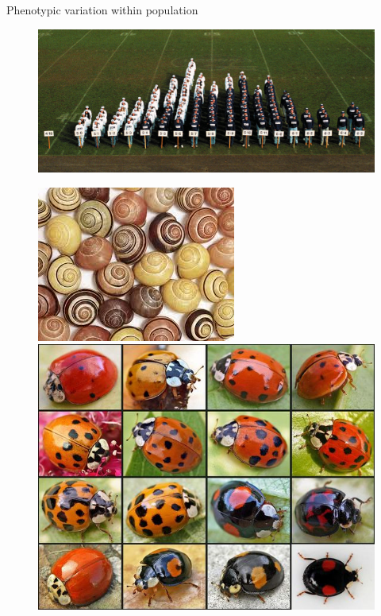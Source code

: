 \documentclass[10pt]{beamer}%
\begin{document}
\begin{frame}[plain]
\begin{columns}
\begin{column}[c]{0.7\textwidth}
\begin{figure}[c]
		\end{figure}
	\end{column}
	\end{columns}
\end{frame}

\begin{frame}{Phenotypic variation within population}
	\begin{figure}
		\includegraphics[width = 0.6 \textwidth]{Figures/Humansize}
	\end{figure}
	\begin{figure}
		\includegraphics[width = 0.45 \textwidth]{Figures/Cepaea}\hspace{0.1cm}		
		\includegraphics[width = 0.45 \textwidth]{Figures/Harmonia}
	\end{figure}
\end{frame}
\end{document}
